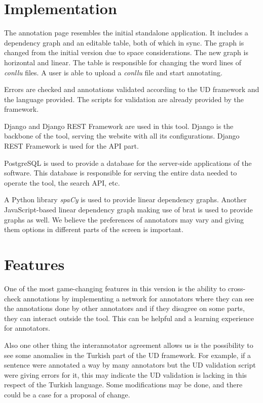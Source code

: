 \documentclass[
]{ceurart}
\begin{document}
\section{Implementation}

The annotation page resembles the initial standalone application.
It includes a dependency graph and an editable table, both of which in sync.
The graph is changed from the initial version due to space considerations.
The new graph is horizontal and linear.
The table is responsible for changing the word lines of \textit{conllu} files.
A user is able to upload a \textit{conllu} file and start annotating.

Errors are checked and annotations validated according to the UD framework and the language provided.
The scripts for validation are already provided by the framework.\cite{UD-git}

Django\cite{django} and Django REST Framework\cite{drf} are used in this tool.
Django is the backbone of the tool, serving the website with all its configurations.
Django REST Framework is used for the API part.

PostgreSQL\cite{psql} is used to provide a database for the server-side applications of the software.
This database is responsible for serving the entire data needed to operate the tool, the search API, etc.

A Python library \textit{spaCy}\cite{spacy} is used to provide linear dependency graphs.
Another JavaScript-based linear dependency graph\cite{spyssalo} making use of brat\cite{brat-vis} is used to provide graphs as well.
We believe the preferences of annotators may vary and giving them options in different parts of the screen is important.

\section{Features}

One of the most game-changing features in this version is the ability to cross-check annotations by implementing a network for annotators where they can see the annotations done by other annotators and if they disagree on some parts, they can interact outside the tool.
This can be helpful and a learning experience for annotators.

Also one other thing the interannotator agreement allows us is the possibility to see some anomalies in the Turkish part of the UD framework.
For example, if a sentence were annotated a way by many annotators but the UD validation script were giving errors for it, this may indicate the UD validation is lacking in this respect of the Turkish language.
Some modifications may be done, and there could be a case for a proposal of change.
\end{document}
